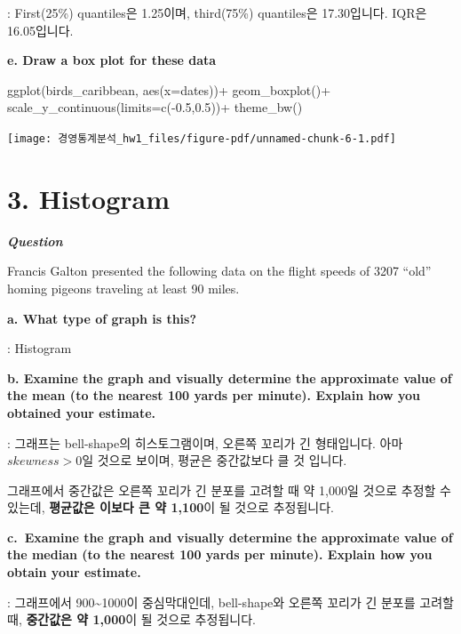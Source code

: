 \documentclass[
  letterpaper,
  DIV=11,
  numbers=noendperiod]{scrreprt}
\newenvironment{Shaded}{\begin{snugshade}}{\end{snugshade}}
\newcommand{\AttributeTok}[1]{\textcolor[rgb]{0.40,0.45,0.13}{#1}}
\newcommand{\FloatTok}[1]{\textcolor[rgb]{0.68,0.00,0.00}{#1}}
\newcommand{\FunctionTok}[1]{\textcolor[rgb]{0.28,0.35,0.67}{#1}}
\newcommand{\NormalTok}[1]{\textcolor[rgb]{0.00,0.23,0.31}{#1}}
\newcommand{\SpecialCharTok}[1]{\textcolor[rgb]{0.37,0.37,0.37}{#1}}
\begin{document}
: First(25\%) quantiles은 1.25이며, third(75\%) quantiles은 17.30입니다.
IQR은 16.05입니다.

\textbf{e. Draw a box plot for these data}

\begin{Shaded}
\begin{Highlighting}[]
\FunctionTok{ggplot}\NormalTok{(birds\_caribbean, }\FunctionTok{aes}\NormalTok{(}\AttributeTok{x=}\NormalTok{dates))}\SpecialCharTok{+}
  \FunctionTok{geom\_boxplot}\NormalTok{()}\SpecialCharTok{+}
  \FunctionTok{scale\_y\_continuous}\NormalTok{(}\AttributeTok{limits=}\FunctionTok{c}\NormalTok{(}\SpecialCharTok{{-}}\FloatTok{0.5}\NormalTok{,}\FloatTok{0.5}\NormalTok{))}\SpecialCharTok{+}
  \FunctionTok{theme\_bw}\NormalTok{()}
\end{Highlighting}
\end{Shaded}

\texttt{[image: 경영통계분석\_hw1\_files/figure-pdf/unnamed-chunk-6-1.pdf]}

\section*{3. Histogram}\label{histogram}


\textbf{\emph{Question}}

Francis Galton presented the following data on the flight speeds of 3207
``old'' homing pigeons traveling at least 90 miles.

\textbf{a. What type of graph is this?}

: Histogram

\textbf{b. Examine the graph and visually determine the approximate
value of the mean (to the nearest 100 yards per minute). Explain how you
obtained your estimate.}

: 그래프는 bell-shape의 히스토그램이며, 오른쪽 꼬리가 긴 형태입니다.
아마 \(skewness>0\)일 것으로 보이며, 평균은 중간값보다 클 것 입니다.

그래프에서 중간값은 오른쪽 꼬리가 긴 분포를 고려할 때 약 1,000일 것으로
추정할 수 있는데, \textbf{평균값은 이보다 큰 약 1,100}이 될 것으로
추정됩니다.

\textbf{c.~Examine the graph and visually determine the approximate
value of the median (to the nearest 100 yards per minute). Explain how
you obtain your estimate.}

: 그래프에서 900\textasciitilde1000이 중심막대인데, bell-shape와 오른쪽
꼬리가 긴 분포를 고려할 때, \textbf{중간값은 약 1,000}이 될 것으로
추정됩니다.
\end{document}
